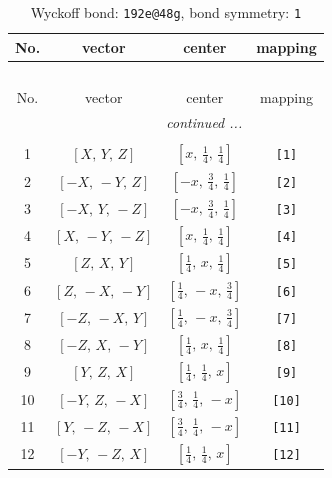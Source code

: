 \documentclass[fleqn,8pt]{jsarticle}
\begin{document}
\begin{longtable}{cccc}
\caption{Wyckoff bond: {\tt 192e@48g}, bond symmetry: {\tt 1}}
 \\
 \hline \hline
No. & vector & center & mapping \\ \hline \endfirsthead

\multicolumn{3}{l}{\tablename\ \thetable{}} \\
 \hline \hline
No. & vector & center & mapping \\ \hline \endhead

 \hline \hline
\multicolumn{3}{r}{\footnotesize\it continued ...} \\ \endfoot

 \hline \hline
\multicolumn{3}{r}{} \\ \endlastfoot

1 & $\left[ X,\, Y,\, Z \right]$ & $\left[ x,\, \frac{1}{4},\, \frac{1}{4} \right]$ & {\tt [1]} \\ \hline
2 & $\left[ - X,\, - Y,\, Z \right]$ & $\left[ - x,\, \frac{3}{4},\, \frac{1}{4} \right]$ & {\tt [2]} \\ \hline
3 & $\left[ - X,\, Y,\, - Z \right]$ & $\left[ - x,\, \frac{3}{4},\, \frac{1}{4} \right]$ & {\tt [3]} \\ \hline
4 & $\left[ X,\, - Y,\, - Z \right]$ & $\left[ x,\, \frac{1}{4},\, \frac{1}{4} \right]$ & {\tt [4]} \\ \hline
5 & $\left[ Z,\, X,\, Y \right]$ & $\left[ \frac{1}{4},\, x,\, \frac{1}{4} \right]$ & {\tt [5]} \\ \hline
6 & $\left[ Z,\, - X,\, - Y \right]$ & $\left[ \frac{1}{4},\, - x,\, \frac{3}{4} \right]$ & {\tt [6]} \\ \hline
7 & $\left[ - Z,\, - X,\, Y \right]$ & $\left[ \frac{1}{4},\, - x,\, \frac{3}{4} \right]$ & {\tt [7]} \\ \hline
8 & $\left[ - Z,\, X,\, - Y \right]$ & $\left[ \frac{1}{4},\, x,\, \frac{1}{4} \right]$ & {\tt [8]} \\ \hline
9 & $\left[ Y,\, Z,\, X \right]$ & $\left[ \frac{1}{4},\, \frac{1}{4},\, x \right]$ & {\tt [9]} \\ \hline
10 & $\left[ - Y,\, Z,\, - X \right]$ & $\left[ \frac{3}{4},\, \frac{1}{4},\, - x \right]$ & {\tt [10]} \\ \hline
11 & $\left[ Y,\, - Z,\, - X \right]$ & $\left[ \frac{3}{4},\, \frac{1}{4},\, - x \right]$ & {\tt [11]} \\ \hline
12 & $\left[ - Y,\, - Z,\, X \right]$ & $\left[ \frac{1}{4},\, \frac{1}{4},\, x \right]$ & {\tt [12]} \\ \hline

\end{longtable}
\end{document}
